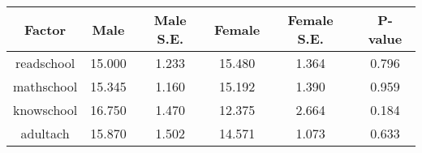\begin{longtable}{c c c c c c}
\toprule
\textbf{Factor} & \textbf{Male} & \textbf{Male S.E.}  & \textbf{Female} & \textbf{Female S.E.} & \textbf{P-value} \\
\midrule
readschool & 15.000 & 1.233 &  15.480 & 1.364 & 0.796 \\
mathschool & 15.345 & 1.160 &  15.192 & 1.390 & 0.959 \\
knowschool & 16.750 & 1.470 &  12.375 & 2.664 & 0.184 \\
adultach & 15.870 & 1.502 &  14.571 & 1.073 & 0.633 \\
\bottomrule
\end{longtable}
